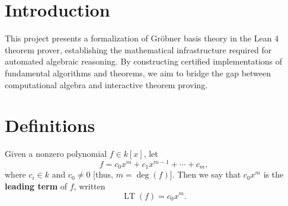 %
%

\chapter{Introduction}
This project presents a formalization of Gröbner basis theory in the Lean 4 theorem prover, establishing the mathematical infrastructure required for automated algebraic reasoning. By constructing certified implementations of fundamental algorithms and theorems, we aim to bridge the gap between computational algebra and interactive theorem proving.

\chapter{Definitions}
\begin{definition}\label{leadingTerm}
  \leanok
  Given a nonzero polynomial \( f \in k[x] \), let
  \[
  f = c_0 x^m + c_1 x^{m-1} + \cdots + c_m,
  \]
  where \( c_i \in k \) and \( c_0 \neq 0 \) [thus, \( m = \deg(f) \)]. Then we say that \( c_0 x^m \) is the \textbf{leading term} of \( f \), written
  \[
  \operatorname{LT}(f) = c_0 x^m.
  \]
\end{definition}

